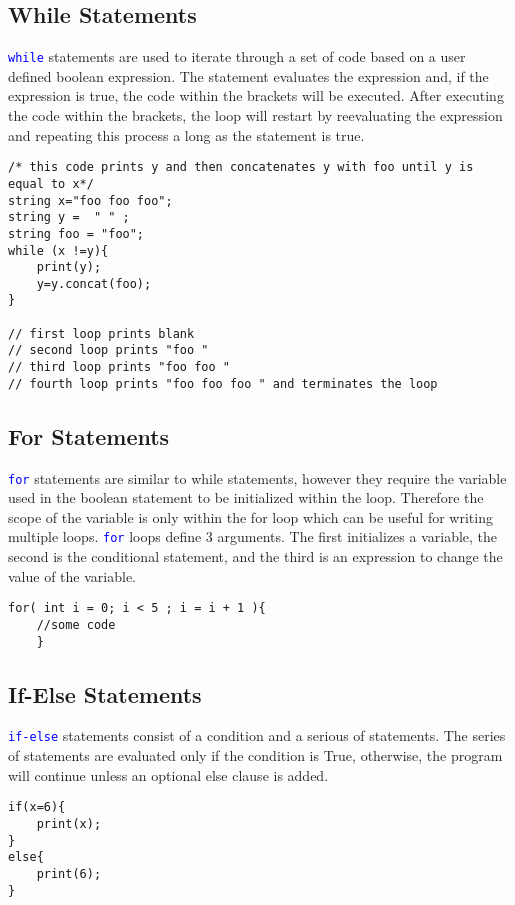 \documentclass[titlepage, 12pt]{report}
\begin{document}
\subsection{While Statements}
\textcolor{blue}{\texttt{while}} statements are used to iterate through a set of code based on a user defined boolean expression. The statement evaluates the expression and, if the expression is true, the code within the brackets will be executed. After executing the code within the brackets, the loop will restart by reevaluating the expression and repeating this process a long as the statement is true. 
\begin{lstlisting}
/* this code prints y and then concatenates y with foo until y is equal to x*/
string x="foo foo foo"; 
string y =  " " ; 
string foo = "foo"; 
while (x !=y){
	print(y);
	y=y.concat(foo);
}

// first loop prints blank
// second loop prints "foo "
// third loop prints "foo foo "
// fourth loop prints "foo foo foo " and terminates the loop
\end{lstlisting}

\subsection{For Statements}
\textcolor{blue}{\texttt{for}} statements are similar to while statements, however they require the variable used in the boolean statement to be initialized within the loop. Therefore the scope of the variable is only within the for loop which can be useful for writing multiple loops. \textcolor{blue}{\texttt{for}} loops define 3 arguments. The first initializes a variable, the second is the conditional statement, and the third is an expression to change the value of the variable.
\begin{lstlisting}
for( int i = 0; i < 5 ; i = i + 1 ){
	//some code
	}	
\end{lstlisting}

\subsection{If-Else Statements}
\textcolor{blue}{\texttt{if-else}} statements consist of a condition and a serious of statements. The series of statements are evaluated only if the condition is True, otherwise, the program will continue unless an optional else clause is added. 
\begin{lstlisting}
if(x=6){
	print(x);
}
else{
	print(6);
}
\end{lstlisting}
\end{document}
